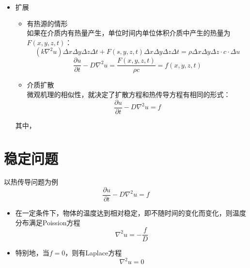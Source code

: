 \begin{itemize}
\item 扩展
\begin{itemize}
	\item 有热源的情形\\
	如果在介质内有热量产生，单位时间内单位体积介质中产生的热量为$F(x,y,z,t)$：
	\begin{equation}
			(k \nabla^2 u)\Delta x \Delta y \Delta z \Delta t + F(s,y,z,t) \Delta x \Delta y \Delta z \Delta t  = \rho \Delta x \Delta y \Delta z \cdot c \cdot \Delta u
	\end{equation}
	\begin{equation}
			\dfrac{\partial u}{\partial t} - D \nabla^2 u = \frac{F(x,y,z,t)}{\rho c} = f(x,y,z,t)
	\end{equation}
\item 介质扩散\\
		微观机理的相似性，就决定了扩散方程和热传导方程有相同的形式：
		\begin{equation}
			\dfrac{\partial u}{\partial t} - D \nabla^2 u = f
		\end{equation}
\end{itemize}
其中，
\end{itemize}

\section{稳定问题}
\noindent 以热传导问题为例
\begin{equation*}
	\dfrac{\partial u}{\partial t} - D \nabla^2 u = f
\end{equation*}
\begin{itemize}
	\item 在一定条件下，物体的温度达到相对稳定，即不随时间的变化而变化，则温度分布满足Poission方程
	\begin{equation}
		\nabla^2 u = - \frac{f}{D}
	\end{equation}
	\item 特别地，当$f = 0$，则有Laplace方程
	\begin{equation}
		\nabla^2 u = 0
	\end{equation}
\end{itemize}

